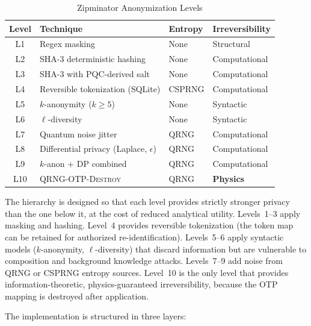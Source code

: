 \documentclass[journal]{IEEEtran}
\begin{document}
\begin{table}[t]
\caption{Zipminator Anonymization Levels}
\label{tab:levels}
\begin{center}
\begin{tabular}{@{}clll@{}}
\toprule
\textbf{Level} & \textbf{Technique} & \textbf{Entropy} & \textbf{Irreversibility} \\
\midrule
L1 & Regex masking & None & Structural \\
L2 & SHA-3 deterministic hashing & None & Computational \\
L3 & SHA-3 with PQC-derived salt & None & Computational \\
L4 & Reversible tokenization (SQLite) & CSPRNG & Computational \\
L5 & $k$-anonymity ($k{\geq}5$) & None & Syntactic \\
L6 & $\ell$-diversity & None & Syntactic \\
L7 & Quantum noise jitter & QRNG & Computational \\
L8 & Differential privacy (Laplace, $\epsilon$) & QRNG & Computational \\
L9 & $k$-anon $+$ DP combined & QRNG & Computational \\
L10 & \textsc{QRNG-OTP-Destroy} & QRNG & \textbf{Physics} \\
\bottomrule
\end{tabular}
\end{center}
\end{table}

The hierarchy is designed so that each level provides strictly stronger privacy than the one below it, at the cost of reduced analytical utility. Levels~1--3 apply masking and hashing. Level~4 provides reversible tokenization (the token map can be retained for authorized re-identification). Levels~5--6 apply syntactic models ($k$-anonymity, $\ell$-diversity) that discard information but are vulnerable to composition and background knowledge attacks. Levels~7--9 add noise from QRNG or CSPRNG entropy sources. Level~10 is the only level that provides information-theoretic, physics-guaranteed irreversibility, because the OTP mapping is destroyed after application.

The implementation is structured in three layers:
\end{document}
